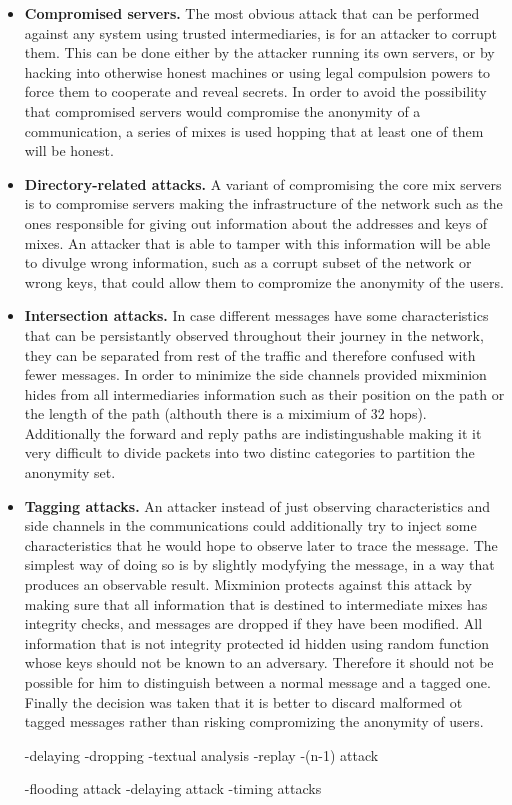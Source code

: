 \documentclass[11pt]{IEEEtran}
\begin{document}
\begin{itemize}

\item \textbf{Compromised servers.} The most obvious attack that can be
performed against any system using trusted intermediaries, is for an
attacker to corrupt them. This can be done either by the attacker
running its own servers, or by hacking into otherwise honest machines
or using legal compulsion powers to force them to cooperate and reveal
secrets. In order to avoid the possibility that compromised servers
would compromise the anonymity of a communication, a series of mixes is
used hopping that at least one of them will be honest.

\item \textbf{Directory-related attacks.} A variant of compromising the core
mix servers is to compromise servers making the infrastructure of the
network such as the ones responsible for giving out information about
the addresses and keys of mixes. An attacker that is able to tamper
with this information will be able to divulge wrong information, such
as a corrupt subset of the network or wrong keys, that could allow
them to compromize the anonymity of the users. %
\item \textbf{Intersection attacks.} In case different messages have
some characteristics that can be persistantly observed throughout
their journey in the network, they can be separated from rest of the
traffic and therefore confused with fewer messages. In order to
minimize the side channels provided mixminion hides from all
intermediaries information such as their position on the path or the
length of the path (althouth there is a miximium of 32
hops). Additionally the forward and reply paths are indistingushable
making it it very difficult to divide packets into two distinc
categories to partition the anonymity set.

\item \textbf{Tagging attacks.} An attacker instead of just observing
characteristics and side channels in the communications could
additionally try to inject some characteristics that he would hope to
observe later to trace the message. The simplest way of doing so is by
slightly modyfying the message, in a way that produces an observable
result. Mixminion protects against this attack by making sure that all
information that is destined to intermediate mixes has integrity
checks, and messages are dropped if they have been modified. All
information that is not integrity protected id hidden using random
function whose keys should not be known to an adversary. Therefore it
should not be possible for him to distinguish between a normal message
and a tagged one. Finally the decision was taken that it is better to
discard malformed ot tagged messages rather than risking compromizing
the anonymity of users.

-delaying
-dropping
-textual analysis
-replay
-(n-1) attack

-flooding attack
-delaying attack
-timing attacks

\end{itemize}
\end{document}
